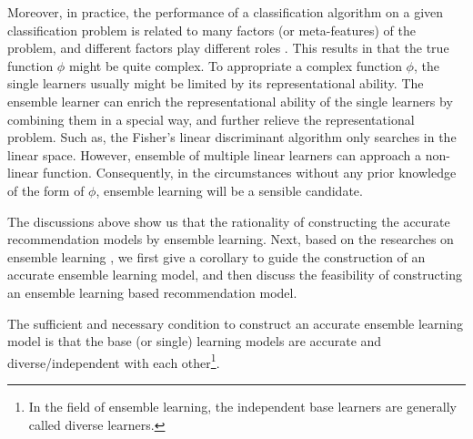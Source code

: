 \documentclass[acmsmall]{acmart}
\begin{document}
Moreover, in practice, the performance of a classification algorithm
on a given classification problem is related to many factors (or
meta-features) of the problem, and different factors play different
roles \cite{wang2014generic}. This results in that the true function
$\phi$ might be quite complex. To appropriate a complex function
$\phi$, the single learners usually might be limited by its
representational ability. The ensemble learner can enrich the
representational ability of the single learners by combining them in
a special way, and further relieve the representational problem.
Such as, the Fisher's linear discriminant algorithm only searches in
the linear space. However, ensemble of multiple linear learners can
approach a non-linear function. Consequently, in the circumstances
without any prior knowledge of the form of $\phi$, ensemble learning
will be a sensible candidate.

The discussions above show us that the rationality of constructing
the accurate recommendation models by ensemble learning. Next, based
on the researches on ensemble learning
\cite{dietterichl2002ensemble,hansen1990neural}, we first give a
corollary to guide the construction of an accurate ensemble learning
model, and then discuss the feasibility of constructing an ensemble
learning based recommendation model.
\begin{corollary}\label{coro:condition}
	The sufficient and necessary condition to construct an accurate
	ensemble learning model is that the base (or single) learning models
	are accurate and diverse/independent with each other\footnote{In the
		field of ensemble learning, the independent base learners are
		generally called diverse learners.}.
\end{corollary}
\end{document}
